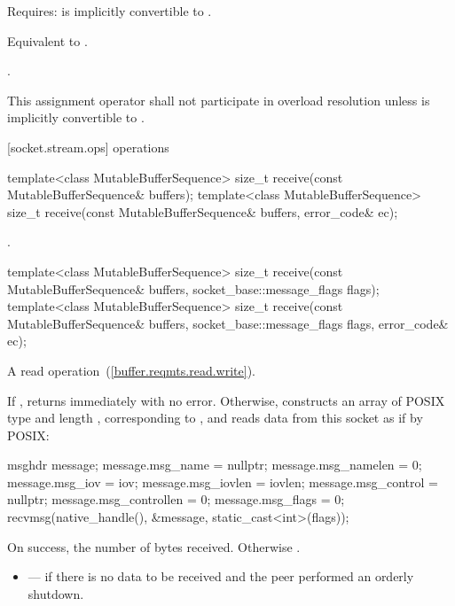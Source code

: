 \begin{itemdescr}
\pnum
Requires:  is implicitly convertible to .

\pnum
\effects Equivalent to .

\pnum
\returns {}.

\pnum
\remarks This assignment operator shall not participate in overload resolution unless  is implicitly convertible to .
\end{itemdescr}



[socket.stream.ops]{ operations}

\begin{itemdecl}
template<class MutableBufferSequence>
  size_t receive(const MutableBufferSequence& buffers);
template<class MutableBufferSequence>
  size_t receive(const MutableBufferSequence& buffers,
                 error_code& ec);
\end{itemdecl}

\begin{itemdescr}
\pnum
\returns {}.
\end{itemdescr}

\begin{itemdecl}
template<class MutableBufferSequence>
  size_t receive(const MutableBufferSequence& buffers,
                 socket_base::message_flags flags);
template<class MutableBufferSequence>
  size_t receive(const MutableBufferSequence& buffers,
                 socket_base::message_flags flags, error_code& ec);
\end{itemdecl}

\begin{itemdescr}
\pnum
A read operation~(\ref{buffer.reqmts.read.write}).

\pnum
\effects If , returns immediately with no error. Otherwise, constructs an array  of POSIX type  and length , corresponding to , and reads data from this socket as if by POSIX: 
\begin{codeblock}
msghdr message;
message.msg_name = nullptr;
message.msg_namelen = 0;
message.msg_iov = iov;
message.msg_iovlen = iovlen;
message.msg_control = nullptr;
message.msg_controllen = 0;
message.msg_flags = 0;
recvmsg(native_handle(), &message, static_cast<int>(flags));
\end{codeblock}


\pnum
\returns On success, the number of bytes received. Otherwise .

\pnum
\errors
\begin{itemize}
\item
{} --- if there is no data to be received and the peer performed an orderly shutdown.
\end{itemize}
\end{itemdescr}

